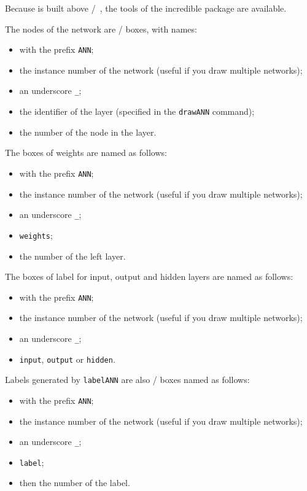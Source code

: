 \documentclass[english]{ltxdoc}
\begin{document}
Because \mpneural is built above \MO/~\cite{ctan-metaobj}, the tools of the
incredible package are available.  

The nodes of the network are \MO/ boxes, with names:
\begin{itemize}
\item  with the prefix \texttt{ANN};
\item the instance number of the network (useful if you draw
multiple networks);
\item an underscore \texttt{\_};
\item the identifier of the layer (specified in the \lstinline+drawANN+ command);
\item the number of the node in the layer.
\end{itemize}

The boxes of weights are named as follows:
\begin{itemize}
\item  with the prefix \texttt{ANN};
\item the instance number of the network (useful if you draw
multiple networks);
\item an underscore \texttt{\_};
\item \texttt{weights};
\item the number of the left layer.
\end{itemize}

The boxes of label for input, output and hidden layers are named as follows:
\begin{itemize}
\item  with the prefix \texttt{ANN};
\item the instance number of the network (useful if you draw
multiple networks);
\item an underscore \texttt{\_};
\item \texttt{input}, \texttt{output} or \texttt{hidden}.
\end{itemize}
  



Labels generated by \lstinline+labelANN+ are also \MO/ boxes named as follows:
\begin{itemize}
\item  with the prefix \texttt{ANN};
\item the instance number of the network (useful if you draw
multiple networks);
\item an underscore \texttt{\_};
\item \texttt{label};
\item then the number of the label. 
\end{itemize}
\end{document}
